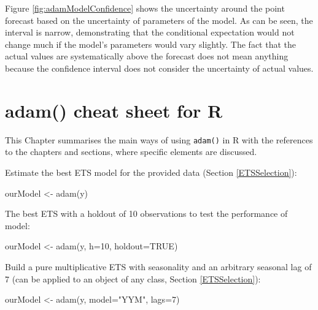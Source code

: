 \documentclass[
]{book}
\newenvironment{Shaded}{\begin{snugshade}}{\end{snugshade}}
\newcommand{\AttributeTok}[1]{\textcolor[rgb]{0.77,0.63,0.00}{#1}}
\newcommand{\ConstantTok}[1]{\textcolor[rgb]{0.00,0.00,0.00}{#1}}
\newcommand{\DecValTok}[1]{\textcolor[rgb]{0.00,0.00,0.81}{#1}}
\newcommand{\FunctionTok}[1]{\textcolor[rgb]{0.00,0.00,0.00}{#1}}
\newcommand{\NormalTok}[1]{#1}
\newcommand{\OtherTok}[1]{\textcolor[rgb]{0.56,0.35,0.01}{#1}}
\newcommand{\StringTok}[1]{\textcolor[rgb]{0.31,0.60,0.02}{#1}}
\theoremstyle{definition}
\theoremstyle{definition}
\theoremstyle{definition}
\theoremstyle{definition}
\theoremstyle{remark}
\begin{document}
Figure \ref{fig:adamModelConfidence} shows the uncertainty around the point forecast based on the uncertainty of parameters of the model. As can be seen, the interval is narrow, demonstrating that the conditional expectation would not change much if the model's parameters would vary slightly. The fact that the actual values are systematically above the forecast does not mean anything because the confidence interval does not consider the uncertainty of actual values.

\hypertarget{cheatSheet}{%
\chapter{adam() cheat sheet for R}\label{cheatSheet}}

This Chapter summarises the main ways of using \texttt{adam()} in R with the references to the chapters and sections, where specific elements are discussed.

Estimate the best ETS model for the provided data (Section \ref{ETSSelection}):

\begin{Shaded}
\begin{Highlighting}[]
\NormalTok{ourModel }\OtherTok{\textless{}{-}} \FunctionTok{adam}\NormalTok{(y)}
\end{Highlighting}
\end{Shaded}

The best ETS with a holdout of 10 observations to test the performance of model:

\begin{Shaded}
\begin{Highlighting}[]
\NormalTok{ourModel }\OtherTok{\textless{}{-}} \FunctionTok{adam}\NormalTok{(y, }\AttributeTok{h=}\DecValTok{10}\NormalTok{, }\AttributeTok{holdout=}\ConstantTok{TRUE}\NormalTok{)}
\end{Highlighting}
\end{Shaded}

Build a pure multiplicative ETS with seasonality and an arbitrary seasonal lag of 7 (can be applied to an object of any class, Section \ref{ETSSelection}):

\begin{Shaded}
\begin{Highlighting}[]
\NormalTok{ourModel }\OtherTok{\textless{}{-}} \FunctionTok{adam}\NormalTok{(y, }\AttributeTok{model=}\StringTok{"YYM"}\NormalTok{, }\AttributeTok{lags=}\DecValTok{7}\NormalTok{)}
\end{Highlighting}
\end{Shaded}
\end{document}
